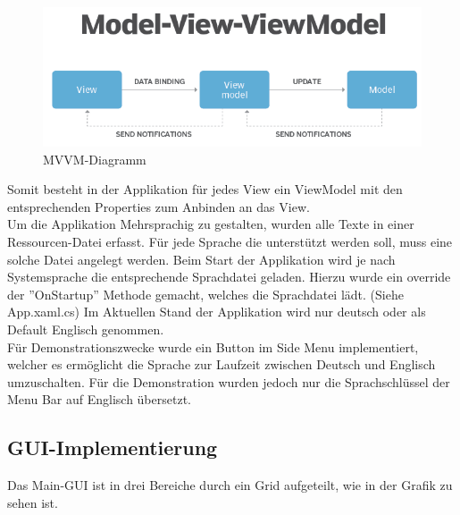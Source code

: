 \begin{figure}[H]
  \begin{center}
    \includegraphics[width=0.6\linewidth]{content/images/mvvm.png}
    \caption{MVVM-Diagramm}
    \label{mvvm}
  \end{center}
\end{figure}

Somit besteht in der Applikation für jedes View ein ViewModel mit den entsprechenden Properties zum Anbinden an das View.\\
Um die Applikation Mehrsprachig zu gestalten, wurden alle Texte in einer Ressourcen-Datei erfasst. Für jede Sprache die unterstützt werden soll, muss eine solche Datei angelegt werden. Beim Start der Applikation wird je nach Systemsprache die entsprechende Sprachdatei geladen. Hierzu wurde ein override der ''OnStartup'' Methode gemacht, welches die Sprachdatei lädt. (Siehe App.xaml.cs) Im Aktuellen Stand der Applikation wird nur deutsch oder als Default Englisch genommen.\\
Für Demonstrationszwecke wurde ein Button im Side Menu implementiert, welcher es ermöglicht die Sprache zur Laufzeit zwischen Deutsch und Englisch umzuschalten. Für die Demonstration wurden jedoch nur die Sprachschlüssel der Menu Bar auf Englisch übersetzt.
 
\newpage
\subsection{GUI-Implementierung}
Das Main-GUI ist in drei Bereiche durch ein Grid aufgeteilt, wie in der Grafik  zu sehen ist.

